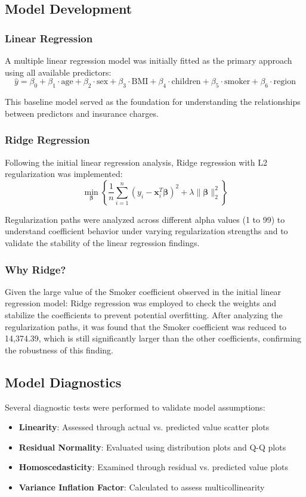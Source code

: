 \documentclass[12pt,a4paper]{article}
\begin{document}
\subsection{Model Development}

\subsubsection{Linear Regression}
A multiple linear regression model was initially fitted as the primary approach using all available predictors:
$$\hat{y} = \beta_0 + \beta_1 \cdot \text{age} + \beta_2 \cdot \text{sex} + \beta_3 \cdot \text{BMI} + \beta_4 \cdot \text{children} + \beta_5 \cdot \text{smoker} + \beta_6 \cdot \text{region}$$

This baseline model served as the foundation for understanding the relationships between predictors and insurance charges.

\subsubsection{Ridge Regression}  
Following the initial linear regression analysis, Ridge regression with L2 regularization was implemented:
$$\min_{\boldsymbol{\beta}} \left\{ \frac{1}{n}\sum_{i=1}^{n}(y_i - \mathbf{x}_i^T\boldsymbol{\beta})^2 + \lambda\|\boldsymbol{\beta}\|_2^2 \right\}$$

Regularization paths were analyzed across different alpha values (1 to 99) to understand coefficient behavior under varying regularization strengths and to validate the stability of the linear regression findings.

\subsubsection{Why Ridge?}
Given the large value of the Smoker coefficient observed in the initial linear regression model:
Ridge regression was employed to check the weights and stabilize the coefficients to prevent potential overfitting. After analyzing the regularization paths, it was found that the Smoker coefficient was reduced to 14,374.39, which is still significantly larger than the other coefficients, confirming the robustness of this finding.

\subsection{Model Diagnostics}

Several diagnostic tests were performed to validate model assumptions:
\begin{itemize}
    \item \textbf{Linearity}: Assessed through actual vs. predicted value scatter plots
    \item \textbf{Residual Normality}: Evaluated using distribution plots and Q-Q plots
    \item \textbf{Homoscedasticity}: Examined through residual vs. predicted value plots
    \item \textbf{Variance Inflation Factor}: Calculated to assess multicollinearity
\end{itemize}
\end{document}
